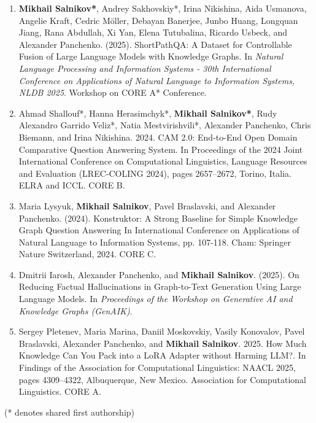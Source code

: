 \begin{enumerate}
    \item \textbf{Mikhail Salnikov*}, Andrey Sakhovskiy*, Irina Nikishina, Aida Usmanova, Angelie Kraft, Cedric Möller, Debayan Banerjee, Junbo Huang, Longquan Jiang, Rana Abdullah, Xi Yan, Elena Tutubalina, Ricardo Usbeck, and Alexander Panchenko. (2025). ShortPathQA: A Dataset for Controllable Fusion of Large Language Models with Knowledge Graphs. In \textit{Natural Language Processing and Information Systems - 30th International Conference on Applications of Natural Language to Information Systems, NLDB 2025}. Workshop on CORE A* Conference.
    \item Ahmad Shallouf*, Hanna Herasimchyk*, \textbf{Mikhail Salnikov*}, Rudy Alexandro Garrido Veliz*, Natia Mestvirishvili*, Alexander Panchenko, Chris Biemann, and Irina Nikishina. 2024. CAM 2.0: End-to-End Open Domain Comparative Question Answering System. In Proceedings of the 2024 Joint International Conference on Computational Linguistics, Language Resources and Evaluation (LREC-COLING 2024), pages 2657–2672, Torino, Italia. ELRA and ICCL. CORE B.
    \item Maria Lysyuk, \textbf{Mikhail Salnikov}, Pavel Braslavski, and Alexander Panchenko. (2024). Konstruktor: A Strong Baseline for Simple Knowledge Graph Question Answering In International Conference on Applications of Natural Language to Information Systems, pp. 107-118. Cham: Springer Nature Switzerland, 2024. CORE C.
    \item Dmitrii Iarosh, Alexander Panchenko, and \textbf{Mikhail Salnikov}. (2025). On Reducing Factual Hallucinations in Graph-to-Text Generation Using Large Language Models. In \textit{Proceedings of the Workshop on Generative AI and Knowledge Graphs (GenAIK)}.
    \item Sergey Pletenev, Maria Marina, Daniil Moskovskiy, Vasily Konovalov, Pavel Braslavski, Alexander Panchenko, and \textbf{Mikhail Salnikov}. 2025. How Much Knowledge Can You Pack into a LoRA Adapter without Harming LLM?. In Findings of the Association for Computational Linguistics: NAACL 2025, pages 4309–4322, Albuquerque, New Mexico. Association for Computational Linguistics. CORE A.
\end{enumerate}
(* denotes shared first authorship)

